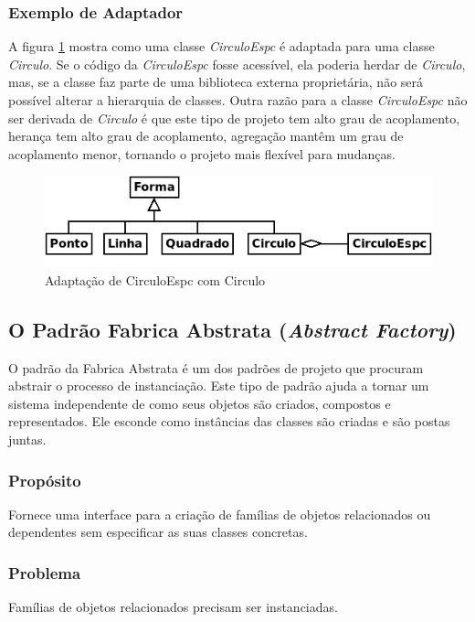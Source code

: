 \subsubsection{Exemplo de Adaptador}
A figura \ref{fig:adaptCirc} mostra como uma classe \emph{CirculoEspc} é adaptada para uma classe \emph{Circulo}. Se o código da \emph{CirculoEspc} fosse acessível, ela poderia herdar de \emph{Circulo}, mas, se a classe faz parte de uma biblioteca externa proprietária, não será possível alterar a hierarquia de classes. Outra razão para a classe \emph{CirculoEspc} não ser derivada de \emph{Circulo} é que este tipo de projeto tem alto grau de acoplamento, herança tem alto grau de acoplamento, agregação mantêm um grau de acoplamento menor, tornando o projeto mais flexível para mudanças. 

\begin{figure}[h]
\begin{center}
\includegraphics[scale=0.5]{adaptCirc.png}
\caption{Adaptação de CirculoEspc com Circulo}\label{fig:adaptCirc}
\end{center}
\end{figure}

\subsection{O Padrão Fabrica Abstrata (\textit{Abstract Factory})}

O padrão da Fabrica Abstrata é um dos padrões de projeto que procuram abstrair o processo de instanciação. Este tipo de padrão ajuda a tornar um sistema independente de como seus objetos são criados, compostos e representados. Ele esconde como instâncias das classes são criadas e são postas juntas.

\subsubsection{Propósito}
Fornece uma interface para a criação de famílias de objetos relacionados ou dependentes sem especificar as suas classes concretas.

\subsubsection{Problema}
Famílias de objetos relacionados precisam ser instanciadas.

